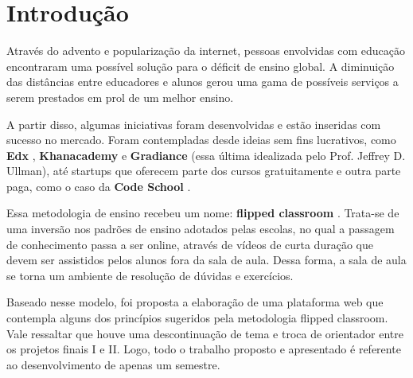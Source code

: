 \documentclass[graduacao,brazil]{ThesisPUC}
\begin{document}

\chapter{Introdu\c{c}\~{a}o}

Atrav\'{e}s do advento e populariza\c{c}\~{a}o da internet, pessoas envolvidas com educa\c{c}\~{a}o
encontraram uma poss\'{i}vel solu\c{c}\~{a}o para o d\'{e}ficit de ensino global. A diminui\c{c}\~{a}o
das dist\^{a}ncias entre educadores e alunos gerou uma gama de poss\'{i}veis servi\c{c}os a serem prestados
em prol de um melhor ensino.

A partir disso, algumas iniciativas foram desenvolvidas e est\~{a}o inseridas com sucesso no
mercado. Foram contempladas desde ideias sem fins lucrativos, como \textbf{Edx} \cite{Edx}, 
\textbf{Khanacademy} \cite{Khanacademy} e \textbf{Gradiance} \cite{Gradiance} (essa \'{u}ltima idealizada 
pelo Prof. Jeffrey D. Ullman), at\'{e} startups que oferecem parte dos cursos gratuitamente e outra 
parte paga, como o caso da \textbf{Code School} \cite{CodeSchool}.

Essa metodologia de ensino recebeu um nome: \textbf{flipped classroom} \cite{FlippedLearning}.
Trata-se de uma invers\~{a}o nos padr\~{o}es de ensino adotados pelas escolas, no qual a passagem de
conhecimento passa a ser online, atrav\'{e}s de v\'{i}deos de curta dura\c{c}\~{a}o que devem ser assistidos
pelos alunos fora da sala de aula. Dessa forma, a sala de aula se torna um ambiente de resolu\c{c}\~{a}o de 
d\'{u}vidas e exerc\'{i}cios.

Baseado nesse modelo, foi proposta a elabora\c{c}\~{a}o de uma plataforma web que contempla alguns dos princ\'{i}pios
sugeridos pela metodologia flipped classroom. Vale ressaltar que houve uma descontinua\c{c}\~{a}o de tema e troca de 
orientador entre os projetos finais I e II. Logo, todo o trabalho proposto e apresentado \'{e} referente ao 
desenvolvimento de apenas um semestre.
\end{document}
